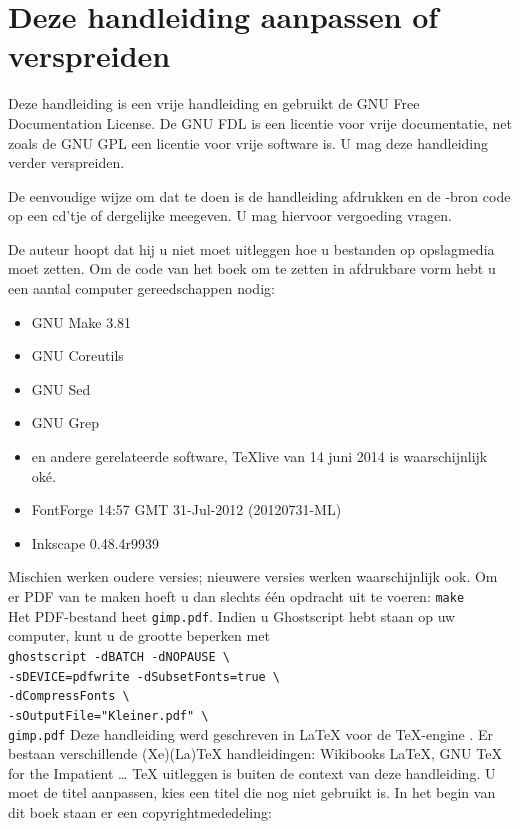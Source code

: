 \documentclass[11pt,a5paper,twoside]{book}
\begin{document}
\chapter{Deze handleiding aanpassen of verspreiden}
 Deze handleiding is een vrije handleiding en gebruikt de GNU Free Documentation
  License. De GNU FDL is een licentie voor vrije documentatie, net zoals de GNU GPL
  een licentie voor vrije software is. U mag deze handleiding verder verspreiden.

 De eenvoudige wijze om dat te doen is de handleiding afdrukken en de
  \XELATEX{}-bron code op een cd’tje of dergelijke meegeven. U mag hiervoor
  vergoeding vragen. 

 De auteur hoopt dat hij u niet moet uitleggen hoe u bestanden op opslagmedia moet zetten.
 Om de code van het boek om te zetten in afdrukbare vorm hebt u een aantal computer%
  gereedschappen nodig:
 \begin{itemize}
  \item GNU Make 3.81
  \item GNU Coreutils
  \item GNU Sed
  \item GNU Grep
  \item \XELATEX{} en andere gerelateerde software, \TeX{}live van 14 juni 2014 is waarschijnlijk oké.
  \item FontForge 14:57 GMT 31-Jul-2012 (20120731-ML)
  \item Inkscape 0.48.4r9939
 \end{itemize}
 Mischien werken oudere versies; nieuwere versies werken waarschijnlijk ook.
 Om er PDF van te maken hoeft u dan slechts één opdracht uit te voeren:
 \texttt{make}\\
 Het PDF-bestand heet \texttt{gimp.pdf}. Indien u Ghostscript hebt staan op
  uw computer, kunt u de grootte beperken met\\
   \texttt{ghostscript -dBATCH -dNOPAUSE \textbackslash{}\\
   -sDEVICE=pdfwrite -dSubsetFonts=true \textbackslash{}\\
   -dCompressFonts \textbackslash{}\\
   -sOutputFile="Kleiner.pdf" \textbackslash{}\\
   gimp.pdf}
 Deze handleiding werd geschreven in \LaTeX{} voor de \TeX{}-engine \XETEX{}.
 Er bestaan verschillende (Xe)(La)\TeX{} handleidingen: Wikibooks \LaTeX{},
  GNU TeX for the Impatient … \TeX{} uitleggen is buiten de context van deze
   handleiding.
  U moet de titel aanpassen, kies een titel die nog niet gebruikt is.
  In het begin van dit boek staan er een copyrightmededeling:
\end{document}
